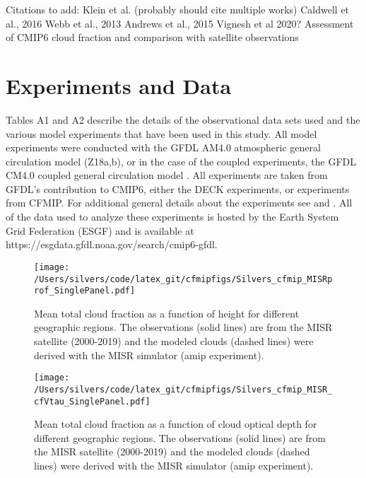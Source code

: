 \documentclass[draft]{agujournal2019}
\begin{document}
Citations to add: 
Klein et al. (probably should cite multiple works)
Caldwell et al., 2016
Webb et al., 2013
Andrews et al., 2015
Vignesh et al 2020?    Assessment of CMIP6 cloud fraction and comparison with satellite observations

\appendix
\section{Experiments and Data}

Tables A1 and A2 describe the details of the observational data sets used and the various model experiments that 
have been used in this study.  All model experiments were conducted with the GFDL AM4.0 atmospheric general 
circulation model (Z18a,b), or in the case of the coupled experiments, the GFDL CM4.0 coupled general circulation 
model \cite{Held_etal_2019}. 
All experiments are taken from GFDL's contribution to CMIP6, either the DECK experiments, or experiments from CFMIP.
For additional general details about the experiments see \cite{Eyring_etal_2016} and \cite{Webb_etal_2017}.  All of the 
data used to analyze these experiments is hosted by the Earth System Grid Federation (ESGF) and is available at 
https://esgdata.gfdl.noaa.gov/search/cmip6-gfdl.

\begin{figure}
  \centering
    \texttt{[image: /Users/silvers/code/latex\_git/cfmipfigs/Silvers\_cfmip\_MISRprof\_SinglePanel.pdf]}
  \caption{Mean total cloud fraction as a function of height for different geographic regions.  The observations (solid lines) are from the MISR satellite (2000-2019) and the modeled clouds (dashed lines) 
  were derived with the MISR simulator (amip experiment).}
  \label{fig:cf_misr_lowcl}
\end{figure}

\begin{figure}
  \centering
  \texttt{[image: /Users/silvers/code/latex\_git/cfmipfigs/Silvers\_cfmip\_MISR\_cfVtau\_SinglePanel.pdf]}
  \caption{Mean total cloud fraction as a function of cloud optical depth for different geographic regions.  The observations (solid lines) are from the MISR satellite (2000-2019) and the modeled clouds (dashed lines) 
  were derived with the MISR simulator (amip experiment).}
  \label{fig:cf_misr_lowcl}
\end{figure}
\end{document}
